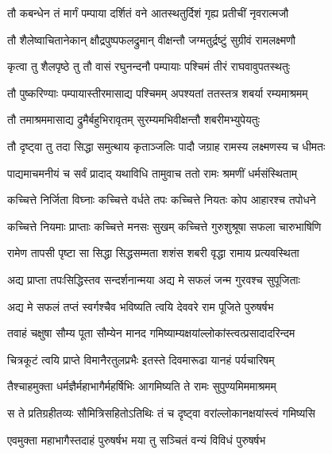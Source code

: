 
\twolineshloka
{तौ कबन्धेन तं मार्गं पम्पाया दर्शितं वने}
{आतस्थतुर्दिशं गृह्य प्रतीचीं नृवरात्मजौ} %

\twolineshloka
{तौ शैलेष्वाचितानेकान् क्षौद्रपुष्पफलद्रुमान्}
{वीक्षन्तौ जग्मतुर्द्रष्टुं सुग्रीवं रामलक्ष्मणौ} %

\twolineshloka
{कृत्वा तु शैलपृष्ठे तु तौ वासं रघुनन्दनौ}
{पम्पायाः पश्चिमं तीरं राघवावुपतस्थतुः} %

\twolineshloka
{तौ पुष्करिण्याः पम्पायास्तीरमासाद्य पश्चिमम्}
{अपश्यतां ततस्तत्र शबर्या रम्यमाश्रमम्} %

\twolineshloka
{तौ तमाश्रममासाद्य द्रुमैर्बहुभिरावृतम्}
{सुरम्यमभिवीक्षन्तौ शबरीमभ्युपेयतुः} %

\twolineshloka
{तौ दृष्ट्वा तु तदा सिद्धा समुत्थाय कृताञ्जलिः}
{पादौ जग्राह रामस्य लक्ष्मणस्य च धीमतः} %

\twolineshloka
{पाद्यमाचमनीयं च सर्वं प्रादाद् यथाविधि}
{तामुवाच ततो रामः श्रमणीं धर्मसंस्थिताम्} %

\twolineshloka
{कच्चित्ते निर्जिता विघ्नाः कच्चित्ते वर्धते तपः}
{कच्चित्ते नियतः कोप आहारश्च तपोधने} %

\twolineshloka
{कच्चित्ते नियमाः प्राप्ताः कच्चित्ते मनसः सुखम्}
{कच्चित्ते गुरुशुश्रूषा सफला चारुभाषिणि} %

\twolineshloka
{रामेण तापसी पृष्टा सा सिद्धा सिद्धसम्मता}
{शशंस शबरी वृद्धा रामाय प्रत्यवस्थिता} %

\twolineshloka
{अद्य प्राप्ता तपःसिद्धिस्तव सन्दर्शनान्मया}
{अद्य मे सफलं जन्म गुरवश्च सुपूजिताः} %

\twolineshloka
{अद्य मे सफलं तप्तं स्वर्गश्चैव भविष्यति}
{त्वयि देववरे राम पूजिते पुरुषर्षभ} %

\twolineshloka
{तवाहं चक्षुषा सौम्य पूता सौम्येन मानद}
{गमिष्याम्यक्षयांल्लोकांस्त्वत्प्रसादादरिन्दम} %

\twolineshloka
{चित्रकूटं त्वयि प्राप्ते विमानैरतुलप्रभैः}
{इतस्ते दिवमारूढा यानहं पर्यचारिषम्} %

\twolineshloka
{तैश्चाहमुक्ता धर्मज्ञैर्महाभागैर्महर्षिभिः}
{आगमिष्यति ते रामः सुपुण्यमिममाश्रमम्} %

\twolineshloka
{स ते प्रतिग्रहीतव्यः सौमित्रिसहितोऽतिथिः}
{तं च दृष्ट्वा वरांल्लोकानक्षयांस्त्वं गमिष्यसि} %

\twolineshloka
{एवमुक्ता महाभागैस्तदाहं पुरुषर्षभ}
{मया तु सञ्चितं वन्यं विविधं पुरुषर्षभ} %

